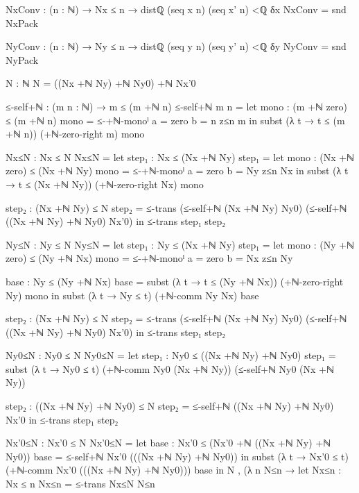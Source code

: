 \documentclass[11pt,a4paper]{book}
\begin{document}
\begin{code}
{        NxConv : (n : ℕ) → Nx ≤ n → distℚ (seq x n) (seq x' n) <ℚ δx
        NxConv = snd NxPack

        NyConv : (n : ℕ) → Ny ≤ n → distℚ (seq y n) (seq y' n) <ℚ δy
        NyConv = snd NyPack

        N : ℕ
        N = ((Nx +ℕ Ny) +ℕ Ny0) +ℕ Nx'0

        ≤-self+ℕ : (m n : ℕ) → m ≤ (m +ℕ n)
        ≤-self+ℕ m n =
          let
            mono : (m +ℕ zero) ≤ (m +ℕ n)
            mono = ≤-+ℕ-monoˡ {a = zero} {b = n} z≤n m
          in
          subst (λ t → t ≤ (m +ℕ n)) (+ℕ-zero-right m) mono

        Nx≤N : Nx ≤ N
        Nx≤N =
          let
            step₁ : Nx ≤ (Nx +ℕ Ny)
            step₁ =
              let
                mono : (Nx +ℕ zero) ≤ (Nx +ℕ Ny)
                mono = ≤-+ℕ-monoˡ {a = zero} {b = Ny} z≤n Nx
              in
              subst (λ t → t ≤ (Nx +ℕ Ny)) (+ℕ-zero-right Nx) mono

            step₂ : (Nx +ℕ Ny) ≤ N
            step₂ =
              ≤-trans
                (≤-self+ℕ (Nx +ℕ Ny) Ny0)
                (≤-self+ℕ ((Nx +ℕ Ny) +ℕ Ny0) Nx'0)
          in
          ≤-trans step₁ step₂

        Ny≤N : Ny ≤ N
        Ny≤N =
          let
            step₁ : Ny ≤ (Nx +ℕ Ny)
            step₁ =
              let
                mono : (Ny +ℕ zero) ≤ (Ny +ℕ Nx)
                mono = ≤-+ℕ-monoˡ {a = zero} {b = Nx} z≤n Ny

                base : Ny ≤ (Ny +ℕ Nx)
                base = subst (λ t → t ≤ (Ny +ℕ Nx)) (+ℕ-zero-right Ny) mono
              in
              subst (λ t → Ny ≤ t) (+ℕ-comm Ny Nx) base

            step₂ : (Nx +ℕ Ny) ≤ N
            step₂ =
              ≤-trans
                (≤-self+ℕ (Nx +ℕ Ny) Ny0)
                (≤-self+ℕ ((Nx +ℕ Ny) +ℕ Ny0) Nx'0)
          in
          ≤-trans step₁ step₂

        Ny0≤N : Ny0 ≤ N
        Ny0≤N =
          let
            step₁ : Ny0 ≤ ((Nx +ℕ Ny) +ℕ Ny0)
            step₁ =
              subst (λ t → Ny0 ≤ t) (+ℕ-comm Ny0 (Nx +ℕ Ny)) (≤-self+ℕ Ny0 (Nx +ℕ Ny))

            step₂ : ((Nx +ℕ Ny) +ℕ Ny0) ≤ N
            step₂ = ≤-self+ℕ ((Nx +ℕ Ny) +ℕ Ny0) Nx'0
          in
          ≤-trans step₁ step₂

        Nx'0≤N : Nx'0 ≤ N
        Nx'0≤N =
          let
            base : Nx'0 ≤ (Nx'0 +ℕ ((Nx +ℕ Ny) +ℕ Ny0))
            base = ≤-self+ℕ Nx'0 (((Nx +ℕ Ny) +ℕ Ny0))
          in
          subst (λ t → Nx'0 ≤ t) (+ℕ-comm Nx'0 (((Nx +ℕ Ny) +ℕ Ny0))) base
      in
      N , (λ n N≤n →
        let
          Nx≤n : Nx ≤ n
          Nx≤n = ≤-trans Nx≤N N≤n

}
\end{code}
\end{document}
